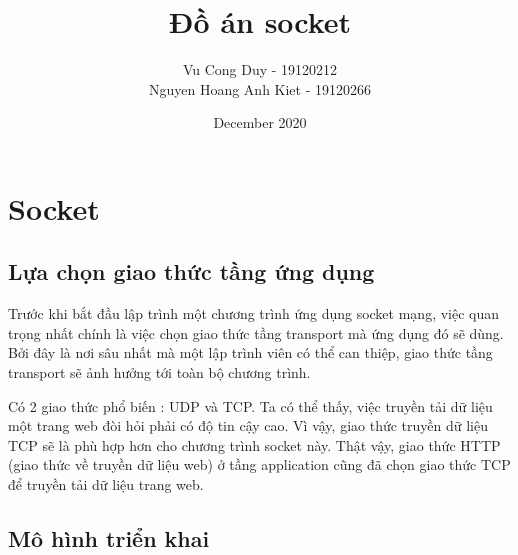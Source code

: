 \documentclass[14pt]{extreport}
\title{Đồ án socket}
\author{Vu Cong Duy - 19120212\\ Nguyen Hoang Anh Kiet - 19120266}
\date{December 2020}
\begin{document}
\maketitle
\chapter{Socket}
\section{Lựa chọn giao thức tầng ứng dụng}

Trước khi bắt đầu lập trình một chương trình ứng dụng socket mạng, việc quan trọng nhất chính là việc chọn giao thức tầng transport mà ứng dụng đó sẽ dùng.\cite{1} Bởi đây là nơi sâu nhất mà một lập trình viên có thể can thiệp, giao thức tầng transport sẽ ảnh hưởng tới toàn bộ chương trình.

Có 2 giao thức phổ biến : UDP và TCP. Ta có thể thấy, việc truyền tải dữ liệu một trang web đòi hỏi phải có độ tin cậy cao. Vì vậy, giao thức truyền dữ liệu TCP sẽ là phù hợp hơn cho chương trình socket này. Thật vậy, giao thức HTTP (giao thức về truyền dữ liệu web) ở tầng application cũng đã chọn giao thức TCP để truyền tải dữ liệu trang web.


\section{Mô hình triển khai}
\end{document}
